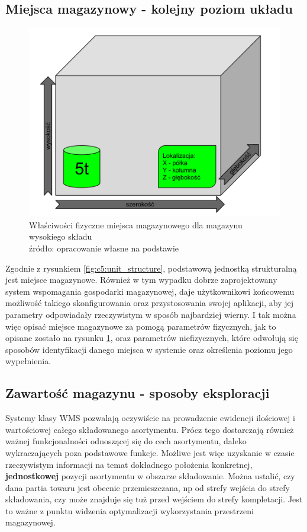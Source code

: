 	\subsection{Miejsca magazynowy - kolejny poziom układu}
		\begin{figure}[h]
			\centering
			\includegraphics[width=\textwidth]{images/storage_unit_description}
			\caption[Miejsce magazynowe - właściwości fizyczne]{
					Właściwości fizyczne miejsca magazynowego dla magazynu wysokiego składu \\
					źródło: opracowanie własne na podstawie \cite{IDL}
			}
			\label{fig:c5:storage_unit_description}
		\end{figure}
		Zgodnie z rysunkiem \ref{fig:c5:unit_structure}, podstawową jednostką strukturalną jest miejsce magazynowe.
		Również w tym wypadku dobrze zaprojektowany system wspomagania gospodarki magazynowej, daje 
		użytkownikowi końcowemu możliwość takiego skonfigurowania oraz przystosowania swojej aplikacji,
		aby jej parametry odpowiadały rzeczywistym w sposób najbardziej wierny. I tak można więc opisać miejsce 
		magazynowe za pomogą parametrów fizycznych, jak to opisane zostało na rysunku \ref{fig:c5:storage_unit_description},
		oraz parametrów niefizycznych, które odwołują się sposobów identyfikacji danego miejsca 
		w systemie oraz określenia poziomu jego wypełnienia. 
	\subsection{Zawartość magazynu - sposoby eksploracji}
		Systemy klasy WMS pozwalają oczywiście na prowadzenie ewidencji ilościowej i wartościowej całego
		składowanego asortymentu. Prócz tego dostarczają również ważnej funkcjonalności odnoszącej się do cech asortymentu,
		daleko wykraczających poza podstawowe funkcje. Możliwe jest więc uzyskanie w czasie rzeczywistym informacji na temat
		dokładnego położenia konkretnej, \textbf{jednostkowej} pozycji asortymentu w obszarze składowanie. Można 
		ustalić, czy dana partia towaru jest obecnie przemieszczana, np od strefy wejścia do strefy składowania, czy może
		znajduje się tuż przed wejściem do strefy kompletacji. Jest to ważne z punktu widzenia optymalizacji
		wykorzystania przestrzeni magazynowej. \\
		
